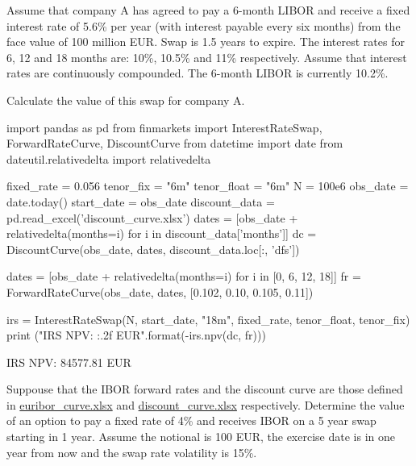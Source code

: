 \begin{question}
Assume that company A has agreed to pay a 6-month LIBOR and receive a fixed interest rate of 5.6\% per year (with interest payable every six months) from the face value of 100 million EUR. Swap is 1.5 years to expire. The interest rates for 6, 12 and 18 months are: 10\%, 10.5\% and 11\% respectively. Assume that interest rates are continuously compounded. The 6-month LIBOR is currently 10.2\%. 

Calculate the value of this swap for company A.
\end{question}

\cprotEnv\begin{solution}
\begin{ipython}
import pandas as pd
from finmarkets import InterestRateSwap, ForwardRateCurve, DiscountCurve
from datetime import date
from dateutil.relativedelta import relativedelta

fixed_rate = 0.056
tenor_fix = "6m"
tenor_float = "6m"
N = 100e6
obs_date = date.today()
start_date = obs_date 
discount_data = pd.read_excel('discount_curve.xlsx')
dates = [obs_date + relativedelta(months=i) for i in discount_data['months']]
dc = DiscountCurve(obs_date, dates, discount_data.loc[:, 'dfs'])

dates = [obs_date + relativedelta(months=i) for i in [0, 6, 12, 18]]
fr = ForwardRateCurve(obs_date, dates, [0.102, 0.10, 0.105, 0.11])

irs = InterestRateSwap(N, start_date, "18m", fixed_rate, tenor_float, tenor_fix)
print ("IRS NPV: {:.2f} EUR".format(-irs.npv(dc, fr)))
\end{ipython}
\begin{ioutput}
IRS NPV: 84577.81 EUR
\end{ioutput}
\end{solution}

\begin{question}
Suppouse that the IBOR forward rates and the discount curve are those defined in
\href{https://github.com/matteosan1/finance_course/raw/master/input_files/euribor_curve.xlsx}{euribor\_curve.xlsx} and \href{https://github.com/matteosan1/finance_course/raw/master/input_files/discount_curve.xlsx}{discount\_curve.xlsx} respectively.
Determine the value of an option to pay a fixed rate of 4\% and receives IBOR on a 5 year swap starting in 1 year. Assume the notional is 100 EUR, the exercise date is in one year from now and the swap rate volatility is 15\%.
\end{question}

